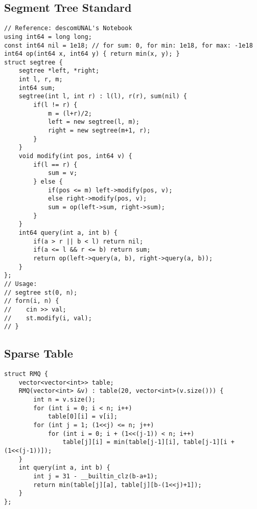 \documentclass[10pt,letterpaper,twocolumn,twosided]{article}
\begin{document}
\subsection{Segment Tree Standard}
\begin{lstlisting}
// Reference: descomUNAL's Notebook
using int64 = long long;
const int64 nil = 1e18; // for sum: 0, for min: 1e18, for max: -1e18
int64 op(int64 x, int64 y) { return min(x, y); }
struct segtree {
    segtree *left, *right;
    int l, r, m;
    int64 sum;
    segtree(int l, int r) : l(l), r(r), sum(nil) {
        if(l != r) {
            m = (l+r)/2;
            left = new segtree(l, m);
            right = new segtree(m+1, r);
        }
    }
    void modify(int pos, int64 v) {
        if(l == r) {
            sum = v;
        } else {
            if(pos <= m) left->modify(pos, v);
            else right->modify(pos, v);
            sum = op(left->sum, right->sum);
        }
    }
    int64 query(int a, int b) {
        if(a > r || b < l) return nil;
        if(a <= l && r <= b) return sum;
        return op(left->query(a, b), right->query(a, b));
    }
};
// Usage:
// segtree st(0, n);
// forn(i, n) {
//    cin >> val;
//    st.modify(i, val);
// }
\end{lstlisting}

\subsection{Sparse Table}
\begin{lstlisting}
struct RMQ {
    vector<vector<int>> table;
    RMQ(vector<int> &v) : table(20, vector<int>(v.size())) {
        int n = v.size();
        for (int i = 0; i < n; i++)
            table[0][i] = v[i];
        for (int j = 1; (1<<j) <= n; j++)
            for (int i = 0; i + (1<<(j-1)) < n; i++)
                table[j][i] = min(table[j-1][i], table[j-1][i + (1<<(j-1))]);
    }
    int query(int a, int b) {
        int j = 31 - __builtin_clz(b-a+1);
        return min(table[j][a], table[j][b-(1<<j)+1]);
    }
};
\end{lstlisting}
\end{document}
